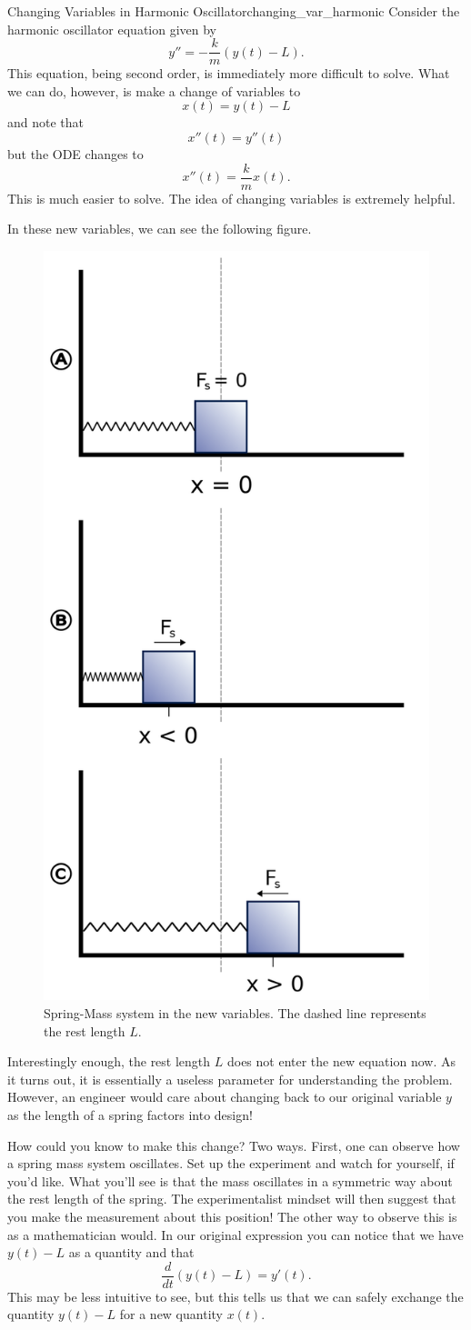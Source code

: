         \begin{ex}{Changing Variables in Harmonic Oscillator}{changing_var_harmonic}
        Consider the harmonic oscillator equation given by
        \[
        y'' = -\frac{k}{m}(y(t)-L).
        \]
        This equation, being second order, is immediately more difficult to solve.  What we can do, however, is make a change of variables to
        \[
        x(t)=y(t)-L
        \]
        and note that
        \[
        x''(t)=y''(t)
        \]
        but the ODE changes to
        \[
        x''(t)=\frac{k}{m}x(t).
        \]
        This is much easier to solve.  The idea of changing variables is extremely helpful.
        
        In these new variables, we can see the following figure.
        \begin{figure}[H]
            \centering
            \includegraphics[width=.3\textwidth]{Figures/spring-mass.png}
            \caption{Spring-Mass system in the new variables. The dashed line represents the rest length $L$.}
            \label{fig:spring_mass}
        \end{figure}
        Interestingly enough, the rest length $L$ does not enter the new equation now. As it turns out, it is essentially a useless parameter for understanding the problem.  However, an engineer would care about changing back to our original variable $y$ as the length of a spring factors into design!
        
        How could you know to make this change? Two ways.  First, one can observe how a spring mass system oscillates.  Set up the experiment and watch for yourself, if you'd like.  What you'll see is that the mass oscillates in a symmetric way about the rest length of the spring. The experimentalist mindset will then suggest that you make the measurement about this position! The other way to observe this is as a mathematician would.  In our original expression you can notice that we have $y(t)-L$ as a quantity and that 
        \[
        \frac{d}{dt} (y(t)-L) = y'(t).
        \]
        This may be less intuitive to see, but this tells us that we can safely exchange the quantity $y(t)-L$ for a new quantity $x(t).$
        \end{ex}
        
